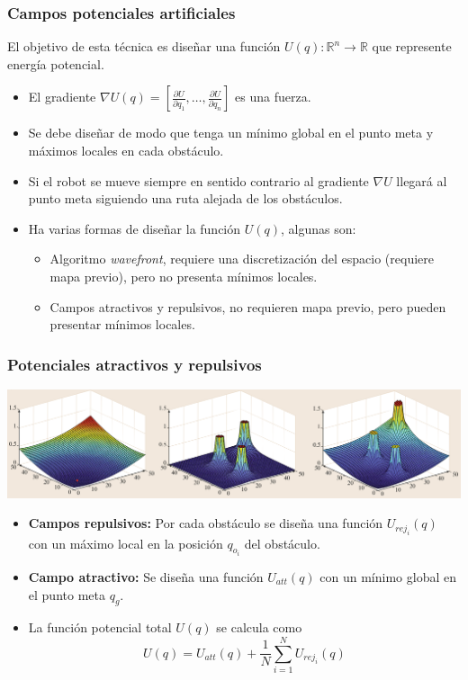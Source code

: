 \begin{frame}\frametitle{Campos potenciales artificiales}
  El objetivo de esta técnica es diseñar una función $U(q):\mathbb{R}^n\rightarrow \mathbb{R}$ que represente energía potencial.
  \begin{itemize}
  \item El gradiente $\nabla U(q) = \left[\frac{\partial U}{\partial q_1},\dots,\frac{\partial U}{\partial q_n}\right]$ es una fuerza.
  \item Se debe diseñar de modo que tenga un mínimo global en el punto meta y máximos locales en cada obstáculo.
  \item Si el robot se mueve siempre en sentido contrario al gradiente $\nabla U$ llegará al punto meta siguiendo una ruta alejada de los obstáculos.
  \item Ha varias formas de diseñar la función $U(q)$, algunas son:
    \begin{itemize}
    \item Algoritmo \textit{wavefront}, requiere una discretización del espacio (requiere mapa previo), pero no presenta mínimos locales.
    \item Campos atractivos y repulsivos, no requieren mapa previo, pero pueden presentar mínimos locales. 
    \end{itemize}
  \end{itemize}
\end{frame}

\begin{frame}\frametitle{Potenciales atractivos y repulsivos}
  \includegraphics[width=\textwidth]{Figures/PotFieldsExample.png}
  \begin{itemize}
  \item \textbf{Campos repulsivos:} Por cada obstáculo se diseña una función $U_{rej_i}(q)$ con un máximo local en la posición $q_{o_i}$ del obstáculo.
  \item \textbf{Campo atractivo:} Se diseña una función $U_{att}(q)$ con un mínimo global en el punto meta $q_g$.
  \item La función potencial total $U(q)$ se calcula como
    \[ U(q) = U_{att}(q) + \frac{1}{N}\sum_{i=1}^N U_{rej_i}(q)\]
  \end{itemize}
\end{frame}

